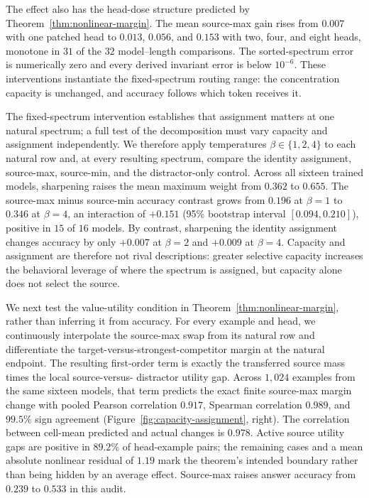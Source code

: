 \documentclass[letterpaper]{article} %
\begin{document}
The effect also has the head-dose structure predicted by Theorem~\ref{thm:nonlinear-margin}.
The mean source-max gain rises from $0.007$ with one patched head to $0.013$, $0.056$, and $0.153$ with two,
four, and eight heads, monotone in $31$ of the $32$ model--length comparisons.
The sorted-spectrum error is numerically zero and every derived invariant error is below $10^{-6}$.
These interventions instantiate the fixed-spectrum routing range: the concentration capacity is unchanged,
and accuracy follows which token receives it.

The fixed-spectrum intervention establishes that assignment matters at one natural spectrum; a full test of
the decomposition must vary capacity and assignment independently.
We therefore apply temperatures $\beta\in\{1,2,4\}$ to each natural row and, at every resulting spectrum,
compare the identity assignment, source-max, source-min, and the distractor-only control.
Across all sixteen trained models, sharpening raises the mean maximum weight from $0.362$ to $0.655$.
The source-max minus source-min accuracy contrast grows from $0.196$ at $\beta=1$ to $0.346$ at $\beta=4$,
an interaction of $+0.151$ (95\% bootstrap interval $[0.094,0.210]$), positive in $15$ of $16$ models.
By contrast, sharpening the identity assignment changes accuracy by only $+0.007$ at $\beta=2$ and
$+0.009$ at $\beta=4$.
Capacity and assignment are therefore not rival descriptions: greater selective capacity increases the
behavioral leverage of where the spectrum is assigned, but capacity alone does not select the source.

We next test the value-utility condition in Theorem~\ref{thm:nonlinear-margin}, rather than inferring it from
accuracy.
For every example and head, we continuously interpolate the source-max swap from its natural row and
differentiate the target-versus-strongest-competitor margin at the natural endpoint.
The resulting first-order term is exactly the transferred source mass times the local source-versus-
distractor utility gap.
Across $1{,}024$ examples from the same sixteen models, that term predicts the exact finite source-max
margin change with pooled Pearson correlation $0.917$, Spearman correlation $0.989$, and $99.5\%$ sign
agreement (Figure~\ref{fig:capacity-assignment}, right).
The correlation between cell-mean predicted and actual changes is $0.978$.
Active source utility gaps are positive in $89.2\%$ of head-example pairs; the remaining cases and a mean
absolute nonlinear residual of $1.19$ mark the theorem's intended boundary rather than being hidden by an
average effect.
Source-max raises answer accuracy from $0.239$ to $0.533$ in this audit.
\end{document}
